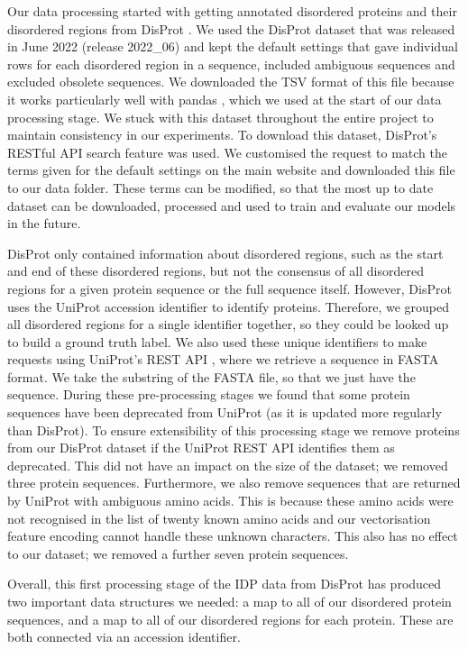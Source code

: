 \documentclass{l4proj}
\begin{document}
Our data processing started with getting annotated disordered proteins and their disordered regions from DisProt \citep{disprot}. We used the DisProt dataset that was released in June 2022 (release 2022\_06) and kept the default settings that gave individual rows for each disordered region in a sequence, included ambiguous sequences and excluded obsolete sequences. We downloaded the TSV format of this file because it works particularly well with pandas \citep{Mckinney:10}, which we used at the start of our data processing stage. We stuck with this dataset throughout the entire project to maintain consistency in our experiments. To download this dataset, DisProt’s RESTful API search feature \citep{disprot} was used. We customised the request to match the terms given for the default settings on the main website and downloaded this file to our data folder. These terms can be modified, so that the most up to date dataset can be downloaded, processed and used to train and evaluate our models in the future.

DisProt only contained information about disordered regions, such as the start and end of these disordered regions, but not the consensus of all disordered regions for a given protein sequence or the full sequence itself. However, DisProt uses the UniProt accession identifier to identify proteins. Therefore, we grouped all disordered regions for a single identifier together, so they could be looked up to build a ground truth label. We also used these unique identifiers to make requests using UniProt’s REST API \citep{uniprot:22}, where we retrieve a sequence in FASTA format. We take the substring of the FASTA file, so that we just have the sequence. During these pre-processing stages we found that some protein sequences have been deprecated from UniProt (as it is updated more regularly than DisProt). To ensure extensibility of this processing stage we remove proteins from our DisProt dataset if the UniProt REST API identifies them as deprecated. This did not have an impact on the size of the dataset; we removed three protein sequences. Furthermore, we also remove sequences that are returned by UniProt with ambiguous amino acids. This is because these amino acids were not recognised in the list of twenty known amino acids and our vectorisation feature encoding cannot handle these unknown characters. This also has no effect to our dataset; we removed a further seven protein sequences.

Overall, this first processing stage of the IDP data from DisProt has produced two important data structures we needed: a map to all of our disordered protein sequences, and a map to all of our disordered regions for each protein. These are both connected via an accession identifier.
\end{document}
